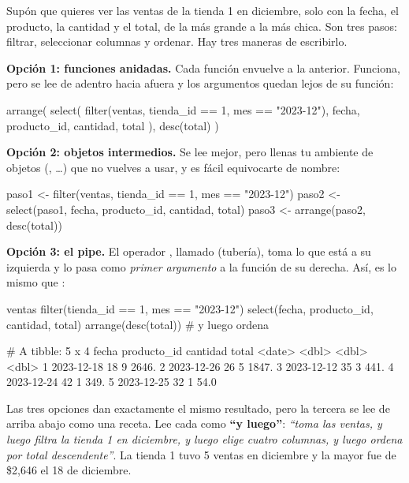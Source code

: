 Supón que quieres ver las ventas de la tienda 1 en diciembre, solo con la
fecha, el producto, la cantidad y el total, de la más grande a la más
chica. Son tres pasos: filtrar, seleccionar columnas y ordenar. Hay tres
maneras de escribirlo.

\textbf{Opción 1: funciones anidadas.} Cada función envuelve a la anterior.
Funciona, pero se lee de adentro hacia afuera y los argumentos quedan lejos
de su función:

\begin{rcode}
arrange(
  select(
    filter(ventas, tienda_id == 1, mes == "2023-12"),
    fecha, producto_id, cantidad, total
  ),
  desc(total)
)
\end{rcode}

\textbf{Opción 2: objetos intermedios.} Se lee mejor, pero llenas tu
ambiente de objetos (, \ldots) que no vuelves a
usar, y es fácil equivocarte de nombre:

\begin{rcode}
paso1 <- filter(ventas, tienda_id == 1, mes == "2023-12")
paso2 <- select(paso1, fecha, producto_id, cantidad, total)
paso3 <- arrange(paso2, desc(total))
\end{rcode}

\textbf{Opción 3: el pipe.} El operador \codigo{\%>\%}, llamado
 (tubería), toma lo que está a su izquierda y lo pasa como
\emph{primer argumento} a la función de su derecha. Así,
 es lo mismo que :

\begin{rcode}
ventas %
  filter(tienda_id == 1, mes == "2023-12") %
  select(fecha, producto_id, cantidad, total) %
  arrange(desc(total))                       # y luego ordena
\end{rcode}
\begin{rsalida}
# A tibble: 5 x 4
  fecha      producto_id cantidad  total
  <date>           <dbl>    <dbl>  <dbl>
1 2023-12-18          18        9 2646. 
2 2023-12-26          26        5 1847. 
3 2023-12-12          35        3  441. 
4 2023-12-24          42        1  349. 
5 2023-12-25          32        1   54.0
\end{rsalida}

Las tres opciones dan exactamente el mismo resultado, pero la tercera se lee
de arriba abajo como una receta. Lee cada \codigo{\%>\%} como
\textbf{``y luego''}: \emph{``toma las ventas, y luego filtra la tienda 1 en
diciembre, y luego elige cuatro columnas, y luego ordena por total
descendente''}. La tienda 1 tuvo 5 ventas en diciembre y la mayor fue de
\$2,646 el 18 de diciembre.

